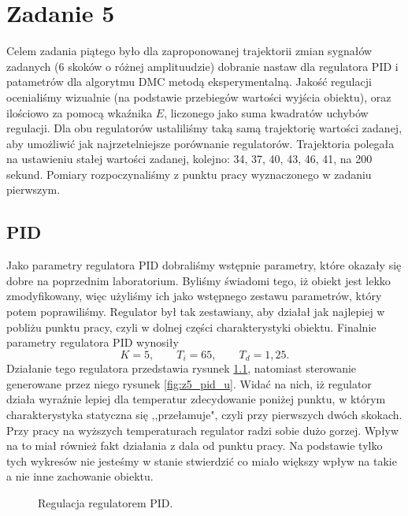 \chapter{Zadanie 5}
Celem zadania piątego było dla zaproponowanej trajektorii zmian sygnałów zadanych (6 skoków o różnej amplituudzie)
dobranie nastaw dla regulatora PID i patametrów dla algorytmu DMC metodą eksperymentalną.
Jakość regulacji ocenialiśmy wizualnie (na podstawie przebiegów wartości wyjścia obiektu), oraz
ilościowo za pomocą wkaźnika $E$, liczonego jako suma kwadratów uchybów regulacji.
Dla obu regulatorów ustaliliśmy taką samą trajektorię wartości zadanej, aby umożliwić
jak najrzetelniejsze porównanie regulatorów. Trajektoria polegała na ustawieniu
stałej wartości zadanej, kolejno: 34, 37, 40, 43, 46, 41, na 200 sekund.
Pomiary rozpoczynaliśmy z punktu pracy wyznaczonego w zadaniu pierwszym.
\section{PID}
Jako parametry regulatora PID dobraliśmy wstępnie parametry, które okazały się
dobre na poprzednim laboratorium. Byliśmy świadomi tego, iż obiekt jest lekko
zmodyfikowany, więc użyliśmy ich jako wstępnego zestawu parametrów, który potem
poprawiliśmy. Regulator był tak zestawiany, aby działał jak najlepiej w pobliżu punktu pracy,
czyli w dolnej części charakterystyki obiektu.
Finalnie parametry regulatora PID wynosiły
\begin{equation}
  K = 5, \qquad T_i = 65, \qquad T_d = 1,25.
\end{equation}
Działanie tego regulatora przedstawia rysunek \ref{fig:z5_pid}, natomiast sterowanie
generowane przez niego rysunek \ref{fig:z5_pid_u}. Widać na nich, iż regulator działa
wyraźnie lepiej dla temperatur zdecydowanie poniżej punktu, w którym charakterystyka
statyczna się ,,przełamuje", czyli przy pierwszych dwóch skokach. Przy pracy na wyższych
temperaturach regulator radzi sobie dużo gorzej. Wpływ na to miał również fakt
działania z dala od punktu pracy. Na podstawie tylko tych wykresów nie jesteśmy
w stanie stwierdzić co miało większy wpływ na takie a nie inne zachowanie obiektu.

\begin{figure}[tb]
\centering
{}
\caption{Regulacja regulatorem PID.}
\label{fig:z5_pid}
\end{figure}

